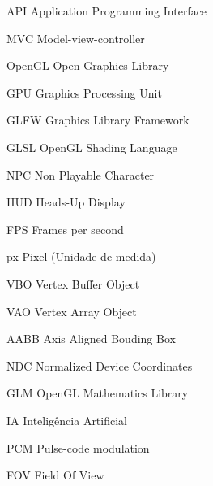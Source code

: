 \documentclass[12pt, 
openright, 
oneside, 
a4paper,    
brazil]{facom-ufu-abntex2}
\begin{document}

\listoffigures*
\cleardoublepage


\listoftables*
\cleardoublepage

\lstlistoflistings
\cleardoublepage




\begin{siglas} 
  \item[API] Application Programming Interface
  \item[MVC] Model-view-controller
  \item[OpenGL] Open Graphics Library
  \item[GPU] Graphics Processing Unit
  \item[GLFW] Graphics Library Framework
  \item[GLSL] OpenGL Shading Language
  \item[NPC] Non Playable Character
  \item[HUD] Heads-Up Display
  \item[FPS] Frames per second
  \item[px] Pixel (Unidade de medida)
  \item[VBO] Vertex Buffer Object
  \item[VAO] Vertex Array Object
  \item[AABB] Axis Aligned Bouding Box
  \item[NDC] Normalized Device Coordinates
  \item[GLM] OpenGL Mathematics Library
  \item[IA] Inteligência Artificial
  \item[PCM] Pulse-code modulation 
  \item[FOV] Field Of View
\end{siglas}


\tableofcontents*
\cleardoublepage




\end{document}
